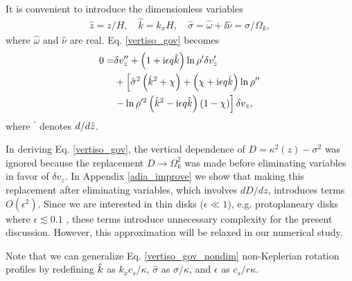 It is convenient to introduce the dimensionless variables
\begin{align}
  \hat{z} = z/H,\quad \hat{k}=k_xH, \quad \hat{\sigma} =\hat{\omega} +
  \ii\hat{\nu}= \sigma/\Omega_k,
\end{align}
where $\hat{\omega}$ and $\hat{\nu}$ are real. 
Eq. \ref{vertiso_gov} becomes 
\begin{align}
  0=& \delta v_z ^{\prime\prime} + \left(1 + \mathrm{i}\epsilon
    q\hat{k}\right)\ln\rho^{\prime}\delta v_z^\prime \notag\\
  &+
  \left[\hat{\sigma}^2\left(\hat{k}^2+\chi\right) +
    \left(  \chi + \mathrm{i} \epsilon q\hat{k}\right)\ln\rho^{\prime\prime}\right.
  \notag\\
  &\left.- \ln\rho^{\prime
      2}\left(\hat{k}^2 -
      \mathrm{i}\epsilon
      q\hat{k}\right)\left(1 - \chi\right)\right]\delta v_z,\label{vertiso_gov_nondim}
\end{align}
where $^\prime$ denotes $d/d\hat{z}$.%

In deriving Eq. \ref{vertiso_gov}, the vertical dependence of
$D=\kappa^2(z)-\sigma^2$ was ignored because the replacement
$D\to\Omega_k^2$ was made before eliminating variables in favor of
$\delta v_z$. In Appendix \ref{adia_improve} we show that making this
replacement after eliminating variables, which involves $dD/dz$,
introduces terms $O(\epsilon^2)$. Since we are interested in 
thin disks ($\epsilon\ll 1 $), e.g. protoplaneary disks where 
$\epsilon\lesssim 0.1$ \citep{chiang10}, these terms introduce
unnecessary complexity for the present discussion. However, this
approximation will be relaxed in our numerical study.  


Note that we can generalize Eq. \ref{vertiso_gov_nondim} non-Keplerian
rotation profiles by redefining $\hat{k}$ as $k_xc_s/\kappa$,
$\hat{\sigma}$ as $\sigma/\kappa$, and  $\epsilon$ as $c_s/r\kappa$.     





      



